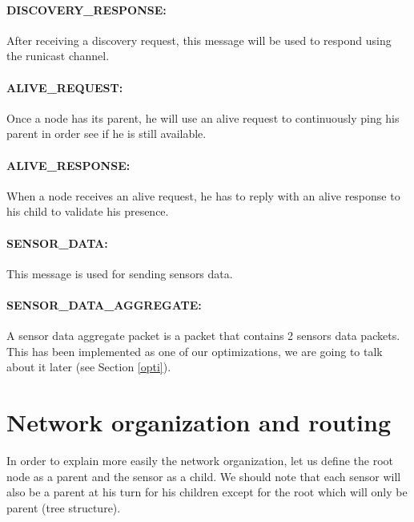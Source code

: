 \documentclass[a4paper,10pt]{article}
\begin{document}
\paragraph{DISCOVERY\_RESPONSE:} After receiving a discovery request, this message will be used to respond using the runicast channel. 

\paragraph{ALIVE\_REQUEST:} Once a node has its parent, he will use an alive request to continuously ping his parent in order see if he is still available.

\paragraph{ALIVE\_RESPONSE:} When a node receives an alive request, he has to reply with an alive response to his child to validate his presence. 

\paragraph{SENSOR\_DATA:} This message is used for sending sensors data. 

\paragraph{SENSOR\_DATA\_AGGREGATE:} A sensor data aggregate packet is a packet that contains 2 sensors data packets. This has been implemented as one of our optimizations, we are going to talk about it  later (see Section \ref{opti}).

\section{Network organization and routing}
\label{routing}
In order to explain more easily the network organization, let us define the root node as a parent and the sensor as a child. We should note that each sensor will also be a parent at his turn for his children except for the root which will only be parent (tree structure).
\end{document}
